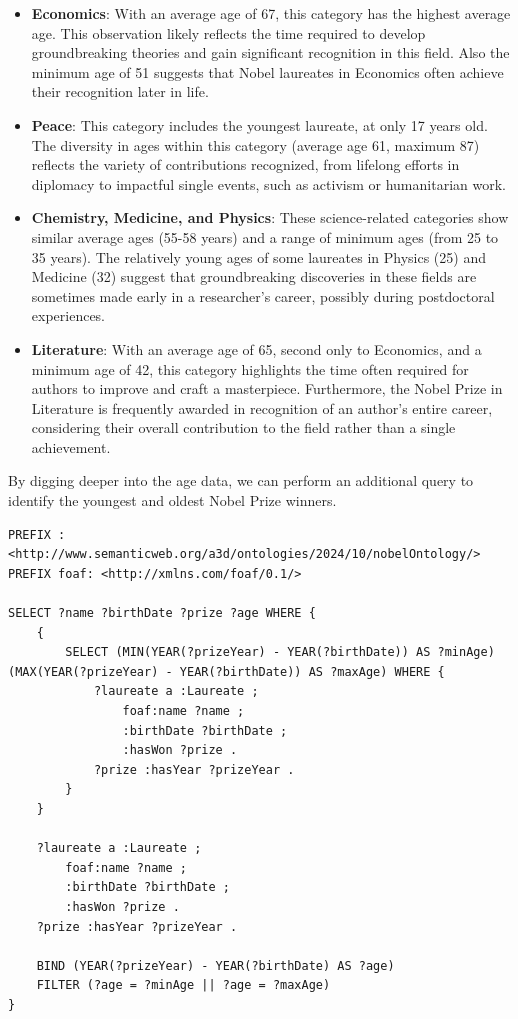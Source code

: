 \documentclass{article}
\begin{document}
\begin{itemize}
	\item \textbf{Economics}: With an average age of 67, this category has the highest average age.
	      This observation likely reflects the time required to develop groundbreaking theories and gain significant recognition in this field. Also the minimum age of 51 suggests that Nobel laureates in Economics often
	      achieve their recognition later in life.

	\item \textbf{Peace}: This category includes the youngest laureate, at only 17 years old.
	      The diversity in ages within this category (average age 61, maximum 87) reflects the variety of
	      contributions recognized, from lifelong efforts in diplomacy to impactful single events, such as activism
	      or humanitarian work.

	\item \textbf{Chemistry, Medicine, and Physics}: These science-related categories show similar average ages
	      (55-58 years) and a range of minimum ages (from 25 to 35 years). The relatively young ages of some laureates
	      in Physics (25) and Medicine (32) suggest that groundbreaking discoveries in these fields are sometimes made
	      early in a researcher's career, possibly during postdoctoral experiences.

	\item \textbf{Literature}: With an average age of 65, second only to Economics, and a minimum age of 42, this
	      category highlights the time often required for authors to improve and craft a masterpiece.
	      Furthermore, the Nobel Prize in Literature is frequently awarded in recognition of an author's
	      entire career, considering their overall contribution to the field rather than a single achievement.
\end{itemize}

\newpage

\noindent By digging deeper into the age data, we can perform an additional query to identify the youngest and oldest
Nobel Prize winners.

\begin{lstlisting}
PREFIX : <http://www.semanticweb.org/a3d/ontologies/2024/10/nobelOntology/>
PREFIX foaf: <http://xmlns.com/foaf/0.1/>

SELECT ?name ?birthDate ?prize ?age WHERE {
    {
        SELECT (MIN(YEAR(?prizeYear) - YEAR(?birthDate)) AS ?minAge) (MAX(YEAR(?prizeYear) - YEAR(?birthDate)) AS ?maxAge) WHERE {
            ?laureate a :Laureate ;
                foaf:name ?name ;
                :birthDate ?birthDate ;
                :hasWon ?prize .
            ?prize :hasYear ?prizeYear .
        }
    }

    ?laureate a :Laureate ;
        foaf:name ?name ;
        :birthDate ?birthDate ;
        :hasWon ?prize .
    ?prize :hasYear ?prizeYear .

    BIND (YEAR(?prizeYear) - YEAR(?birthDate) AS ?age)
    FILTER (?age = ?minAge || ?age = ?maxAge)
}
\end{lstlisting}
\end{document}
